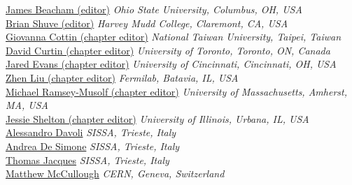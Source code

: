 
\noindent\href{mailto:j.beacham@cern.ch}{James Beacham (editor)} 
\emph{Ohio State University, Columbus, OH, USA}\\

\noindent\href{mailto:bshuve@g.hmc.edu}{Brian Shuve (editor)} 
\emph{Harvey Mudd College, Claremont, CA, USA}\\

\noindent\href{mailto:gcottin@phys.ntu.edu.tw}{Giovanna Cottin (chapter editor)} 
\emph{National Taiwan University, Taipei, Taiwan}\\

\noindent\href{mailto:david.r.curtin@gmail.com}{David Curtin (chapter editor)} 
\emph{University of Toronto, Toronto, ON, Canada}\\

\noindent\href{mailto:jaevans@ucdavis.edu}{Jared Evans (chapter editor)} 
\emph{University of Cincinnati, Cincinnati, OH, USA}\\

\noindent\href{mailto:zliu2@fnal.gov}{Zhen Liu (chapter editor)} 
\emph{Fermilab, Batavia, IL, USA}\\

\noindent\href{mailto:mjrm@physics.umass.edu}{Michael Ramsey-Musolf (chapter editor)} 
\emph{University of Massachusetts, Amherst, MA, USA}\\

\noindent\href{mailto:jshelton137@gmail.com}{Jessie Shelton (chapter editor)} 
\emph{University of Illinois, Urbana, IL, USA}\\

\noindent\href{mailto:alessandro.davoli@sissa.it}{Alessandro Davoli} 
\emph{SISSA, Trieste, Italy}\\

\noindent\href{mailto:andrea.desimone@sissa.it}{Andrea De Simone} 
\emph{SISSA, Trieste, Italy}\\

\noindent\href{mailto:thomas.jacques@sissa.it}{Thomas Jacques} 
\emph{SISSA, Trieste, Italy}\\

\noindent\href{mailto:matthew.mccullough@cern.ch}{Matthew McCullough} 
\emph{CERN, Geneva, Switzerland}\\

